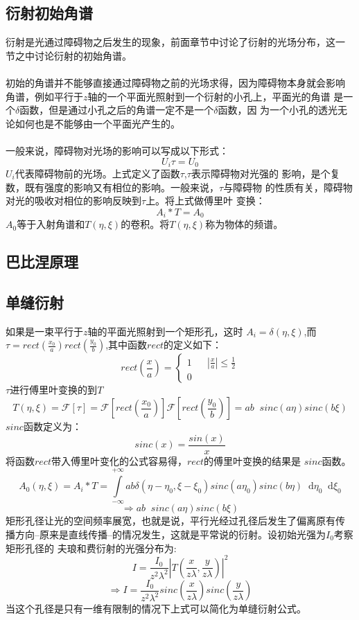 \documentclass{article}
\newcommand*{\dif}{\mathop{}\!\mathrm{d}}
\begin{document}
\subsection{衍射初始角谱}
衍射是光通过障碍物之后发生的现象，前面章节中讨论了衍射的光场分布，这一
节之中讨论衍射的初始角谱。
\paragraph{}
初始的角谱并不能够直接通过障碍物之前的光场求得，因为障碍物本身就会影响
角谱，例如平行于$z$轴的一个平面光照射到一个衍射的小孔上，平面光的角谱
是一个$\delta$函数，但是通过小孔之后的角谱一定不是一个$\delta$函数，因
为一个小孔的透光无论如何也是不能够由一个平面光产生的。
\paragraph{}
一般来说，障碍物对光场的影响可以写成以下形式：
\[U_i\tau=U_0 \]
$U_i$代表障碍物前的光场。上式定义了函数$\tau$,$\tau$表示障碍物对光强的
影响，是个复数，既有强度的影响又有相位的影响。一般来说，$\tau$与障碍物
的性质有关，障碍物对光的吸收对相位的影响反映到$\tau$上。将上式做傅里叶
变换：
\[A_i*T=A_0\]
$A_0$等于入射角谱和$T(\eta,\xi)$的卷积。将$T(\eta,\xi)$称为物体的频谱。
\subsection{巴比涅原理}

\subsection{单缝衍射}
如果是一束平行于$z$轴的平面光照射到一个矩形孔，这时
$A_i=\delta(\eta,\xi)$,而
$\tau=rect(\frac{x_0}{a})rect(\frac{y_0}{b})$,其中函数$rect$的定义如下：
\[
  rect(\frac{x}{a})=\left \{
    \begin{array}{rcl}
      1 && |\frac{x}{a}|\leq \frac{1}{2}\\
      0 && {}
    \end{array}
  \right
  .
\]
$\tau$进行傅里叶变换的到$T$
\[T(\eta,\xi)=\mathscr{F}[\tau]=\mathscr{F}[rect(\frac{x_0}{a})]\mathscr{F}[rect(\frac{y_0}{b})]=ab\mathop{}\!sinc(a\eta)sinc(b\xi)\]
$sinc$函数定义为：
\[sinc(x)=\frac{sin(x)}{x}\]
将函数$rect$带入傅里叶变化的公式容易得，$rect$的傅里叶变换的结果是
$sinc$函数。
\[A_0(\eta,\xi)=A_i*T=\int\limits_{-\infty}^{+\infty}ab\delta(\eta-\eta_0,\xi-\xi_0)sinc(a\eta_0)sinc(b\eta)\dif\eta_0\dif\xi_0\]
\[\Rightarrow ab \mathop{}\!sinc(a\eta)sinc(b\xi)\]
矩形孔径让光的空间频率展宽，也就是说，平行光经过孔径后发生了偏离原有传
播方向--原来是直线传播--的情况发生，这就是平常说的衍射。设初始光强为$I_0$考察矩形孔径的
夫琅和费衍射的光强分布为:
\[I=\frac{I_0}{z^2\lambda^2}|T(\frac{x}{z\lambda},\frac{y}{z\lambda})|^2\]
\[\Rightarrow I=\frac{I_0}{z^2\lambda^2}sinc(\frac{x}{z\lambda})sinc(\frac{y}{z\lambda})\]
当这个孔径是只有一维有限制的情况下上式可以简化为单缝衍射公式。
\end{document}
